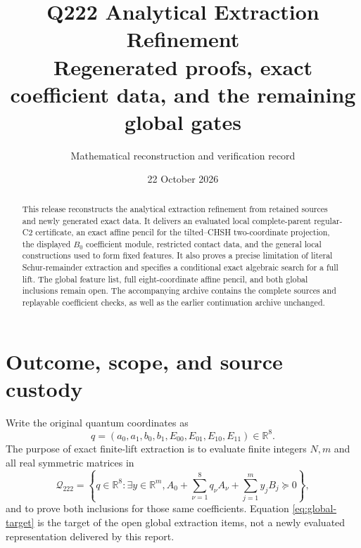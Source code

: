 \documentclass[11pt,a4paper]{article}
\title{\textbf{Q222 Analytical Extraction Refinement}\\[4pt]
\large Regenerated proofs, exact coefficient data, and the remaining global gates}
\author{Mathematical reconstruction and verification record}
\date{22 October 2026}
\newcommand{\Q}{{\mathcal Q_{222}}}
\newcommand{\R}{\mathbb R}
\theoremstyle{definition}
\theoremstyle{remark}
\begin{document}
\maketitle
\begin{abstract}
This release reconstructs the analytical extraction refinement from retained
sources and newly generated exact data. It delivers an evaluated local
complete-parent regular-C2 certificate, an exact affine pencil for the
tilted--CHSH two-coordinate projection, the displayed $B_0$ coefficient
module, restricted contact data, and the general local constructions used
to form fixed features. It also proves a precise limitation of literal
Schur-remainder extraction and specifies a conditional exact algebraic
search for a full lift. The global feature list, full eight-coordinate
affine pencil, and both global inclusions remain open. The accompanying
archive contains the complete sources and replayable coefficient checks,
as well as the earlier continuation archive unchanged.
\end{abstract}

\section{Outcome, scope, and source custody}
\label{sec:release-scope}

Write the original quantum coordinates as
\[
 q=(a_0,a_1,b_0,b_1,E_{00},E_{01},E_{10},E_{11})\in\R^8.
\]
The purpose of exact finite-lift extraction is to evaluate finite integers
$N,m$ and all real symmetric matrices in
\begin{equation}
 \Q=\left\{q\in\R^8:\exists y\in\R^m,
 A_0+\sum_{\nu=1}^{8}q_\nu A_\nu+\sum_{j=1}^{m}y_jB_j\succeq0\right\},
 \label{eq:global-target}
\end{equation}
and to prove both inclusions for those same coefficients. Equation
\eqref{eq:global-target} is the target of the open global extraction items,
not a newly evaluated representation delivered by this report.
\end{document}
